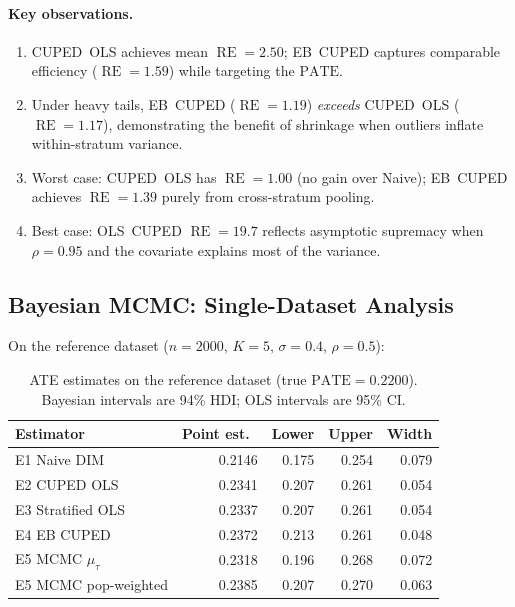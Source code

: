 \documentclass[11pt,letterpaper]{article}
\newcommand{\RE}{\operatorname{RE}}
\newcommand{\PATE}{\text{PATE}}
\begin{document}
\paragraph{Key observations.}
\begin{enumerate}[label=(\roman*)]
  \item CUPED~OLS achieves mean $\RE = 2.50$; EB~CUPED captures
    comparable efficiency ($\RE = 1.59$) while targeting the $\PATE$.
  \item Under heavy tails, EB~CUPED ($\RE = 1.19$) \emph{exceeds}
    CUPED~OLS ($\RE = 1.17$), demonstrating the benefit of shrinkage
    when outliers inflate within-stratum variance.
  \item Worst case: CUPED~OLS has $\RE = 1.00$ (no gain over Naive);
    EB~CUPED achieves $\RE = 1.39$ purely from cross-stratum pooling.
  \item Best case: OLS~CUPED $\RE = 19.7$ reflects asymptotic supremacy
    when $\rho = 0.95$ and the covariate explains most of the variance.
\end{enumerate}


\subsection{Bayesian MCMC: Single-Dataset Analysis}\label{sec:mcmc-single}

On the reference dataset ($n=2000$, $K=5$, $\sigma=0.4$, $\rho=0.5$):

\begin{table}[htbp]
\centering
\caption{ATE estimates on the reference dataset (true $\PATE = 0.2200$).
Bayesian intervals are 94\% HDI; OLS intervals are 95\% CI.}
\label{tab:mcmc-single}
\small
\begin{tabular}{@{}l rrrr@{}}
\toprule
Estimator & Point est.\ & Lower & Upper & Width \\
\midrule
E1 Naive DIM            & 0.2146 & 0.175 & 0.254 & 0.079 \\
E2 CUPED OLS            & 0.2341 & 0.207 & 0.261 & 0.054 \\
E3 Stratified OLS       & 0.2337 & 0.207 & 0.261 & 0.054 \\
E4 EB CUPED             & 0.2372 & 0.213 & 0.261 & 0.048 \\
E5 MCMC $\mu_\tau$      & 0.2318 & 0.196 & 0.268 & 0.072 \\
E5 MCMC pop-weighted    & 0.2385 & 0.207 & 0.270 & 0.063 \\
\bottomrule
\end{tabular}
\end{table}
\end{document}
